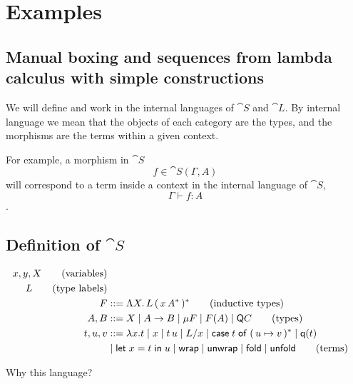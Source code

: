 \section{Examples}\label{sec:examples}

\subsection{Manual boxing and sequences from lambda calculus with simple constructions}

We will define and work in the internal languages of $\cat S$ and $\cat L$. By
internal language we mean that the objects of each category are the types, and
the morphisms are the terms within a given context.

For example, a morphism in $\cat S$ $$ f \in \cat S (\Gamma, A) $$ will
correspond to a term inside a context in the internal language of $\cat S$, $$
  \Gamma \vdash f : A $$.

\subsection{Definition of $\cat S$}

\begin{align*}
  x,y, X  \tag{variables}                                                                                         \\
  L  \tag{type labels}                                                                                            \\
  F       & ::= \Lambda X .  \, L \, (\, x \, A^* \,)^* \tag{inductive types}                                     \\
  A, B    & ::= X \mid A \to B \mid \mu F \mid F(A)  \mid \mathsf{Q} C \tag{types}                                   \\
  t, u, v & ::= \lambda x . t \mid x \mid t\,u \mid L / x \mid \mathsf{case}\; {t}\; \mathsf{of}\; (\, {u} \mapsto {v} \,)^* \mid \mathsf{q}(t) \\
          & \mid \mathsf{let}\; {x} = {t}\; \mathsf{in}\; {u} \mid \mathsf{wrap} \mid \mathsf{unwrap} \mid \mathsf{fold} \mid \mathsf{unfold} \tag{terms}
\end{align*}

Why this language?

